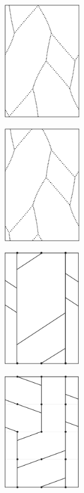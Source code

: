 \documentclass[12pt,twoside]{reedthesis}
\theoremstyle{definition}
\begin{document}
\begin{figure}[p]
  \centering
  \begin{subfigure}[t]{0.24\linewidth}
    \centering
    \includegraphics[height=5cm]{figures/subset_loop_ppqq.pdf}
    \caption{}
  \end{subfigure}
  \hfill
  \begin{subfigure}[t]{0.24\linewidth}
    \centering
    \includegraphics[height=5cm]{figures/subset_loop_ppqq_shifted.pdf}
    \caption{}
  \end{subfigure}
  \hfill
  \begin{subfigure}[t]{0.24\linewidth}
    \centering
    \includegraphics[height=5cm]{figures/subset_loop_ppqq_normalized.pdf}
    \caption{}
  \end{subfigure}
  \hfill
  \begin{subfigure}[t]{0.24\linewidth}
    \centering
    \includegraphics[height=5cm]{figures/subset_loop_ppqq_decomposed.pdf}

\end{subfigure}
\end{figure}
\end{document}
